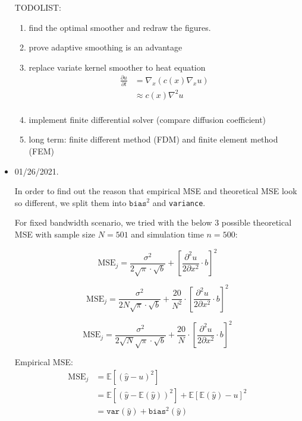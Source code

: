 \documentclass{article}
\begin{document}
\begin{itemize}
TODOLIST:
\begin{enumerate}
\item find the optimal smoother and redraw the figures. 
\item prove adaptive smoothing is an advantage
\item replace variate kernel smoother to heat equation
\begin{align*}
\frac{\partial u}{\partial t} &= \nabla_x (c(x)\nabla_x u) \\ 
&\approx c(x) \nabla^2 u \\ 
\end{align*}
\item implement finite differential solver (compare diffusion coefficient)
\item long term: finite different method (FDM) and finite element method (FEM) 
\end{enumerate}


\item 01/26/2021. 

In order to find out the reason that empirical MSE and theoretical MSE look so different, we split them into $\texttt{bias}^2$ and \texttt{variance}.

For fixed bandwidth scenario, we tried with the below 3 possible theoretical MSE with sample size $N=501$ and simulation time $n=500$:

\begin{equation}
         \text{MSE}_j=  \frac{\sigma^2}{2\sqrt{\pi} \cdot \sqrt{b}}  + \left[\frac{\partial^2 u}{2\partial x^2}\cdot b \right]^2
\end{equation}


\begin{equation}
         \text{MSE}_j=  \frac{\sigma^2}{2N\sqrt{\pi} \cdot \sqrt{b}}  + \frac{20}{N^2}\cdot\left[\frac{\partial^2 u}{2\partial x^2}\cdot b \right]^2
\end{equation}

\begin{equation}
         \text{MSE}_j=  \frac{\sigma^2}{2\sqrt{N}\sqrt{\pi} \cdot \sqrt{b}}  + \frac{20}{N}\cdot\left[\frac{\partial^2 u}{2\partial x^2}\cdot b \right]^2
\end{equation}


Empirical MSE:
\begin{align*}
         \text{MSE}_j&=  \mathbb{E}[(\hat{y} - u)^2]\\
         &= \mathbb{E}[(\hat{y} - \mathbb{E}(\hat{y}))^2] + \mathbb{E}[\mathbb{E} (\hat{y}) -u]^2\\ 
          &= \texttt{var}(\hat{y}) + \texttt{bias}^2(\hat{y})
\end{align*}




\end{itemize}
\end{document}

